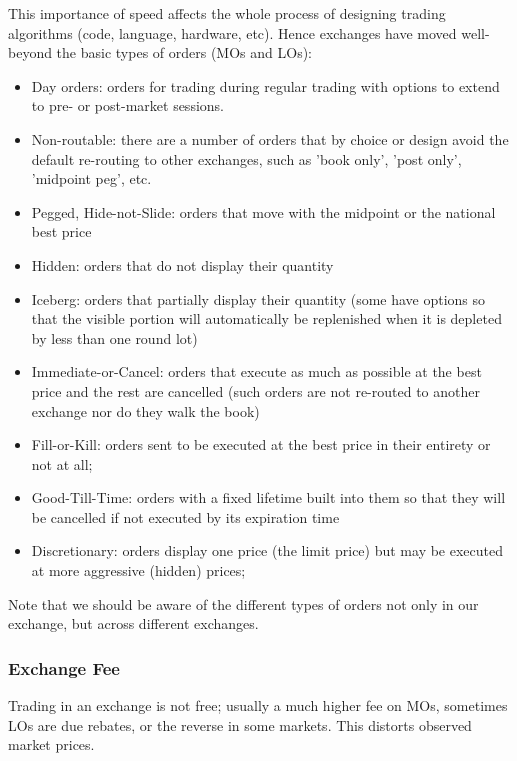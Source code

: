 \documentclass[11pt,a4paper]{article}
\theoremstyle{definition}
\theoremstyle{plain}
\theoremstyle{remark}
\newcommand{\1}{\mathbbm{1}}
\begin{document}
This importance of speed affects the whole process of designing trading algorithms 
(code, language, hardware, etc).  Hence exchanges have moved well-beyond the basic types of 
orders (MOs and LOs): 
\begin{itemize}
    \item Day orders: orders for trading during regular trading with options to extend
    to pre- or post-market sessions. 

    \item Non-routable: there are a number of orders that by choice or design avoid
    the default re-routing to other exchanges, such as 'book only', 'post only', 
    'midpoint peg', etc. 

    \item Pegged, Hide-not-Slide: orders that move with the midpoint or the national
    best price

    \item Hidden: orders that do not display their quantity
    \item Iceberg: orders that partially display their quantity (some have options so that the visible portion will automatically be replenished when it is depleted 
    by less than one round lot)
    
    \item Immediate-or-Cancel: orders that execute as much as possible at the best
    price and the rest are cancelled (such orders are not re-routed to another exchange nor do they walk the book)
    
    \item Fill-or-Kill: orders sent to be executed at the best price in their entirety or
    not at all; 

    \item Good-Till-Time: orders with a fixed lifetime built into them so that they
    will be cancelled if not executed by its expiration time
    
    \item Discretionary: orders display one price (the limit price) but may be executed at more aggressive (hidden) prices; 
\end{itemize}
Note that we should be aware of the different types of orders not only in our exchange, but across different exchanges. 

\subsubsection{Exchange Fee}
Trading in an exchange is not free; usually a much higher fee on MOs, sometimes LOs are due rebates, or the reverse in some markets.
This distorts observed market prices. 
\end{document}
